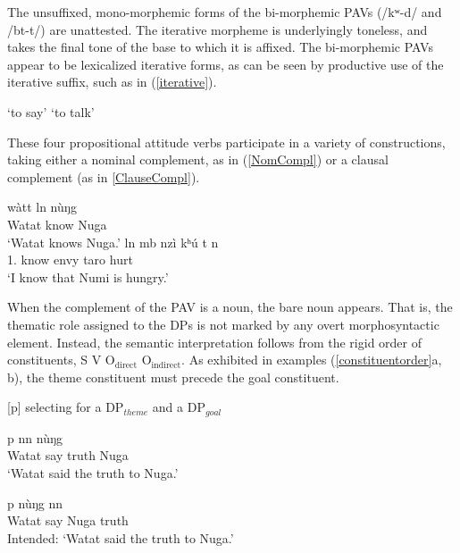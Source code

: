 \documentclass[output=paper,colorlinks,citecolor=brown]{langscibook}
\begin{document}
The unsuffixed, mono-morphemic forms of the bi-morphemic PAVs (/kʷ\epL-d\schwaL/ and /b\epH t-t\schwaH/) are unattested. The iterative morpheme is underlyingly toneless, and takes the final tone of the base to which it is affixed. The bi-morphemic PAVs appear to be lexicalized iterative forms, as can be seen by productive use of the iterative suffix, such as in (\ref{iterative}).

\ea \label{iterative}
    \begin{xlist}
       \tab `to say'
      \tab `to talk'
    \end{xlist}
\z

These four propositional attitude verbs participate in a variety of constructions, taking either a nominal complement, as in (\ref{NomCompl}) or a clausal complement (as in \ref{ClauseCompl}).

\ea
    \begin{xlist}
    \ex \label{NomCompl}
        \gll    w{à}t\epL\epH t l\epL\epH n n{ù}{ŋ}g\epL \\
                Watat           know        Nuga    \\
        \glt    `Watat knows Nuga.'
    \ex \label{ClauseCompl}
         l\epH n     {mb\baruL}    nzì kʰ{ú} \epL\epH t n\dz\epH        \\
                1.  know      envy taro  hurt  \\
        \glt    `I know that Numi is hungry.'
    \end{xlist}
\z

When the complement of the PAV is a noun, the bare noun appears. That is, the thematic role assigned to the DPs is not marked by any overt morphosyntactic element. Instead, the semantic interpretation follows from the rigid order of constituents, S V O$_{\text{direct}}$ O$_{\text{indirect}}$. As exhibited in examples (\ref{constituentorder}a, b), the theme constituent must precede the goal constituent.

\ea \label{constituentorder}
{[p]} selecting for a DP$_{theme}$ and a DP$_{goal}$ \\
    \begin{xlist}
    \ex
         {p} {n\baruH\ds n\baruH} {n{ù}{ŋ}g\epL}\\
             Watat say truth Nuga \\
        \glt `Watat said the truth to Nuga.'

    \ex
         {p} {n{ù}{ŋ}g\epL} {n\baruH\ds n\baruH} \\
             Watat say Nuga truth \\
        \glt Intended: `Watat said the truth to Nuga.'
    \end{xlist}
\z
\end{document}
